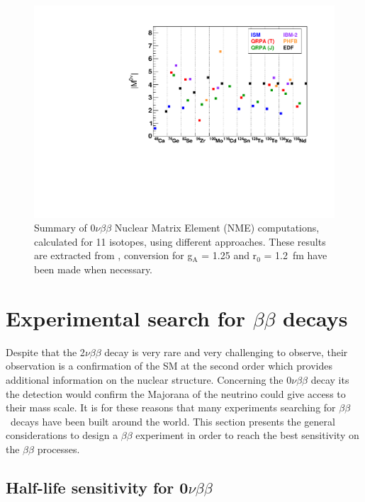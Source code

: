 \documentclass[main.tex]{subfiles}
\begin{document}
\begin{figure}[h!]
\begin{center}
\includegraphics[scale=0.70]{pictures/Chap2/NMEvalue.pdf}
\caption{Summary of 0$\nu\beta\beta$ Nuclear Matrix Element (NME) computations, calculated for 11 isotopes, using different approaches. These results are extracted from \cite{TheoryOfNeutrinolessDBD}, conversion for g$_{\text{A}}$ = 1.25 and r$_{\text{0}}$  = 1.2~fm have been made when necessary.}
\label{NME}
\end{center}
\end{figure}


\FloatBarrier


\section{Experimental search for $\beta\beta$ decays}\label{sec:ExperimentalSearch0nu}


\NI Despite that the 2$\nu\beta\beta$ decay is very rare and very challenging to observe, their observation is a confirmation of the SM at the second order which provides additional information on the nuclear structure. Concerning the 0$\nu\beta\beta$ decay its the detection would confirm the Majorana of the neutrino could give access to their mass scale. It is for these reasons that many experiments searching for $\beta\beta$~decays have been built around the world. This section presents the general considerations to design a $\beta\beta$ experiment in order to reach the best sensitivity on the $\beta\beta$ processes.


\subsection{Half-life sensitivity for 0$\nu\beta\beta$}
\end{document}
